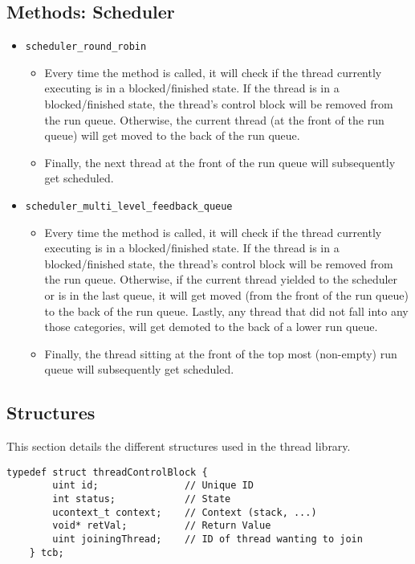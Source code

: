 \documentclass{article}
\begin{document}
\subsection{Methods: Scheduler}
\begin{itemize}
\item \texttt{scheduler\_round\_robin}
    \begin{itemize}
      \item[] Every time the method is called, it will check if the thread currently executing is in a blocked/finished state. If the thread is in a blocked/finished state, the thread's control block will be removed from the run queue. Otherwise, the current thread (at the front of the run queue) will get moved to the back of the run queue. 
      \item[] Finally, the next thread at the front of the run queue will subsequently get scheduled.
    \end{itemize}
    
    \item \texttt{scheduler\_multi\_level\_feedback\_queue}
    \begin{itemize}
      \item[] Every time the method is called, it will check if the thread currently executing is in a blocked/finished state. If the thread is in a blocked/finished state, the thread's control block will be removed from the run queue. Otherwise, if the current thread yielded to the scheduler or is in the last queue, it will get moved (from the front of the run queue) to the back of the run queue. Lastly, any thread that did not fall into any those categories, will get demoted to the back of a lower run queue.
      \item[] Finally, the thread sitting at the front of the top most (non-empty) run queue will subsequently get scheduled.
    \end{itemize}
\end{itemize}

\subsection{Structures}
This section details the different structures used in the thread library.

\renewcommand{\lstlistingname}{Struct}
\begin{lstlisting}[caption={Thread Control Block}]
    typedef struct threadControlBlock {
        uint id;               // Unique ID
        int status;            // State
        ucontext_t context;    // Context (stack, ...)
        void* retVal;          // Return Value
        uint joiningThread;    // ID of thread wanting to join
    } tcb;
\end{lstlisting}
\end{document}

